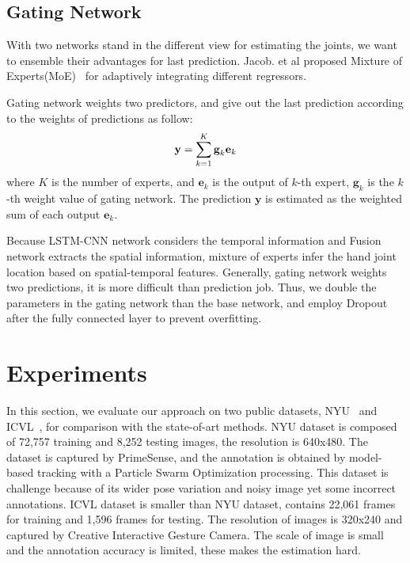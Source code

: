 \documentclass[journal,comsoc]{IEEEtran}
\let\MYoriglatexcaption\caption
\renewcommand{\caption}[2][\relax]{\MYoriglatexcaption[#2]{#2}}
\begin{document}
\subsection{Gating Network}\label{sec:gating network}
With two networks stand in the different view for estimating the joints, we want to ensemble their advantages for last prediction.
Jacob. et al proposed Mixture of Experts(MoE)~\cite{jacobs1991adaptive} for adaptively integrating different regressors.

Gating network weights two predictors, and give out the last prediction according to the weights of predictions as follow:
\begin{equation}\label{eq:gating network}
\centering
\textbf{y} = \sum_{k=1}^K \textbf{g}_k \textbf{e}_k
\end{equation}
where $K$ is the number of experts, and $\textbf{e}_k$ is the output of $k$-th expert, $\textbf{g}_k$ is the $k$-th weight value of
gating network. The prediction $\textbf{y}$ is estimated as the weighted sum of each output $\textbf{e}_k$.

Because LSTM-CNN network considers the temporal information and Fusion network extracts the spatial information, mixture of experts
infer the hand joint location based on spatial-temporal features. Generally, gating network weights two predictions, it is more difficult
than prediction job. Thus, we double the parameters in the gating network than the base network, and employ Dropout~\cite{srivastava2014dropout}
after the fully connected layer to prevent overfitting.




\section{Experiments}\label{sec:experiments}
In this section, we evaluate our approach on two public datasets, NYU~\cite{tompson2014real} and ICVL~\cite{tang2014latent}, for comparison
with the state-of-art methods. NYU dataset is composed of 72,757 training and 8,252 testing images, the resolution is 640x480. The dataset
is captured by PrimeSense, and the annotation is obtained by model-based tracking with a Particle Swarm Optimization processing. This dataset
is challenge because of its wider pose variation and noisy image yet some incorrect annotations. ICVL dataset is smaller than NYU dataset, contains
22,061 frames for training and 1,596 frames for testing. The resolution of images is 320x240 and captured by Creative Interactive Gesture Camera. The scale
of image is small and the annotation accuracy is limited, these makes the estimation hard.
\end{document}

